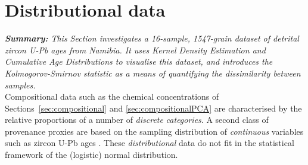 \documentclass[11pt]{article}
\begin{document}
\section{Distributional data}
\label{sec:distributional}

\textit{\textbf{Summary:} This Section investigates a 16-sample,
  1547-grain dataset of detrital zircon U-Pb ages from Namibia.  It
  uses Kernel Density Estimation and Cumulative Age Distributions to
  visualise this dataset, and introduces the Kolmogorov-Smirnov
  statistic as a means of quantifying the dissimilarity between
  samples.}\\

Compositional data such as the chemical concentrations of
Sections~\ref{sec:compositional} and \ref{sec:compositionalPCA} are
characterised by the relative proportions of a number of
\emph{discrete} \emph{categories}. A second class of provenance
proxies are based on the sampling distribution of \emph{continuous}
variables such as zircon U-Pb ages \citep{fedo2003,
  gehrels2011}. These \emph{distributional} data do not fit in the
statistical framework of the (logistic) normal distribution.
\end{document}
